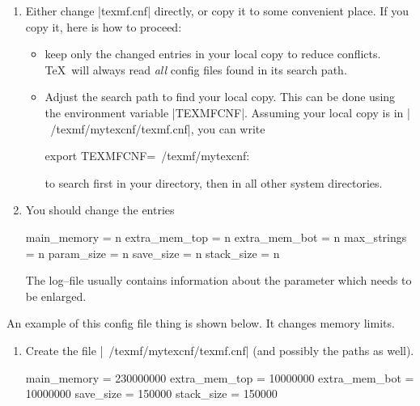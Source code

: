 {\begin{enumerate}
	|/usr/share/texmf/web2c/texmf.cnf|.
	\item Either change |texmf.cnf| directly, or copy it to some convenient place. If you copy it, here is how to proceed:
		\begin{itemize}
			\item keep only the changed entries in your local copy to reduce conflicts. \TeX\ will always read \emph{all} config files found in its search path.
			\item Adjust the search path to find your local copy. This can be done using the environment variable |TEXMFCNF|. Assuming your local copy is in |~/texmf/mytexcnf/texmf.cnf|, you can write
\begin{codeexample}
export TEXMFCNF=~/texmf/mytexcnf:
\end{codeexample}
			to search first in your directory, then in all other system directories.
		\end{itemize}
	\item You should change the entries
\begin{codeexample}
main_memory = n
extra_mem_top = n
extra_mem_bot = n
max_strings = n
param_size = n
save_size = n
stack_size = n
\end{codeexample}
		The log--file usually contains information about the parameter which needs to be enlarged.
\end{enumerate}
An example of this config file thing is shown below. It changes memory limits.
\begin{enumerate}
	\item Create the file |~/texmf/mytexcnf/texmf.cnf| (and possibly the paths as well).
\begin{codeexample}
main_memory = 230000000 %
extra_mem_top = 10000000     %
extra_mem_bot = 10000000     %
save_size = 150000	%
stack_size = 150000	%


\end{codeexample}
\end{enumerate}}

